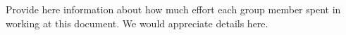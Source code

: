 Provide here information about how much effort each group member spent in working at this document. We would appreciate details here.



%


%